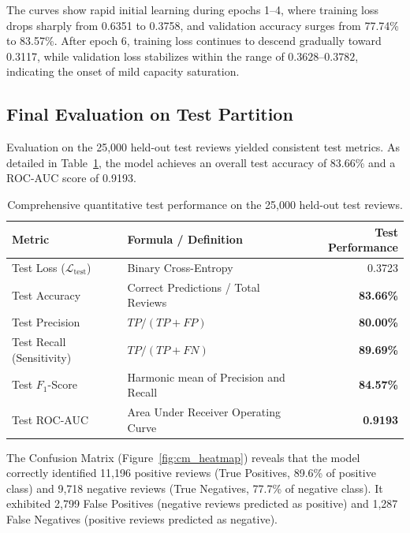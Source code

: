 \documentclass[11pt,a4paper]{article}
\begin{document}
The curves show rapid initial learning during epochs 1--4, where training loss drops sharply from 0.6351 to 0.3758, and validation accuracy surges from 77.74\% to 83.57\%. After epoch 6, training loss continues to descend gradually toward 0.3117, while validation loss stabilizes within the range of $0.3628$--$0.3782$, indicating the onset of mild capacity saturation.

\subsection{Final Evaluation on Test Partition}
Evaluation on the 25,000 held-out test reviews yielded consistent test metrics. As detailed in Table~\ref{tab:test_metrics}, the model achieves an overall test accuracy of 83.66\% and a ROC-AUC score of 0.9193.

\begin{table}[H]
\centering
\begin{tabular}{llr}
\toprule
\textbf{Metric} & \textbf{Formula / Definition} & \textbf{Test Performance} \\
\midrule
Test Loss ($\mathcal{L}_{\text{test}}$) & Binary Cross-Entropy & 0.3723 \\
Test Accuracy                           & Correct Predictions / Total Reviews & \textbf{83.66\%} \\
Test Precision                          & $TP / (TP + FP)$ & \textbf{80.00\%} \\
Test Recall (Sensitivity)               & $TP / (TP + FN)$ & \textbf{89.69\%} \\
Test $F_1$-Score                        & Harmonic mean of Precision and Recall & \textbf{84.57\%} \\
Test ROC-AUC                            & Area Under Receiver Operating Curve & \textbf{0.9193} \\
\bottomrule
\end{tabular}
\caption{Comprehensive quantitative test performance on the 25,000 held-out test reviews.}
\label{tab:test_metrics}
\end{table}

The Confusion Matrix (Figure~\ref{fig:cm_heatmap}) reveals that the model correctly identified 11,196 positive reviews (True Positives, 89.6\% of positive class) and 9,718 negative reviews (True Negatives, 77.7\% of negative class). It exhibited 2,799 False Positives (negative reviews predicted as positive) and 1,287 False Negatives (positive reviews predicted as negative).
\end{document}
